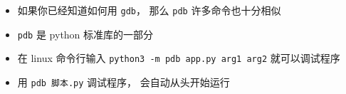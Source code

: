 
\begin{issues}
\issueDraft
\end{issues}

\begin{itemize}
\item 如果你已经知道如何用 \verb|gdb|， 那么 \verb|pdb| 许多命令也十分相似
\item \verb|pdb| 是 python 标准库的一部分
\item 在 linux 命令行输入 \verb|python3 -m pdb app.py arg1 arg2| 就可以调试程序
\item 用 \verb|pdb 脚本.py| 调试程序， 会自动从头开始运行
\end{itemize}
